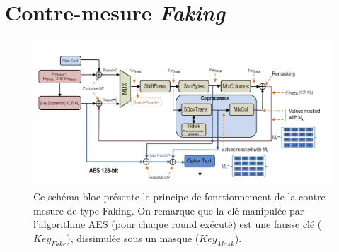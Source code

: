 \documentclass[10pt, oneside, a4paper]{article}
\begin{document}
\section{Contre-mesure \textit{Faking}}
\label{ann:ConceptFaking}
\begin{figure}[htb]
    \centering
    \includegraphics[width=\linewidth]{image/ConceptFaking}
    \caption{Ce schéma-bloc présente le principe de fonctionnement de la contre-mesure de type Faking. On remarque que la clé manipulée par l'algorithme AES (pour chaque round exécuté) est une fausse clé ($Key_{Fake}$), dissimulée sous un masque ($Key_{Mask}$).}
    \label{fig:ConceptFaking} 
\end{figure}
\end{document}
